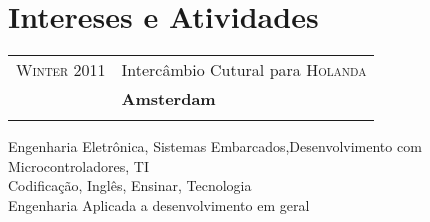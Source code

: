 \documentclass[a4paper,10pt]{article} %
\begin{document}

\section{Intereses e Atividades}
\begin{tabular}{rl}
\textsc{Winter} 2011 & Intercâmbio Cutural para \textsc{Holanda}\textsc{}\\
& \small\emph{}\normalsize\textbf{Amsterdam}\\
&\\
\end{tabular}

Engenharia Eletrônica, Sistemas Embarcados,Desenvolvimento com Microcontroladores, TI\\
Codificação, Inglês, Ensinar, Tecnologia \\
Engenharia Aplicada a desenvolvimento em geral



\end{document}
